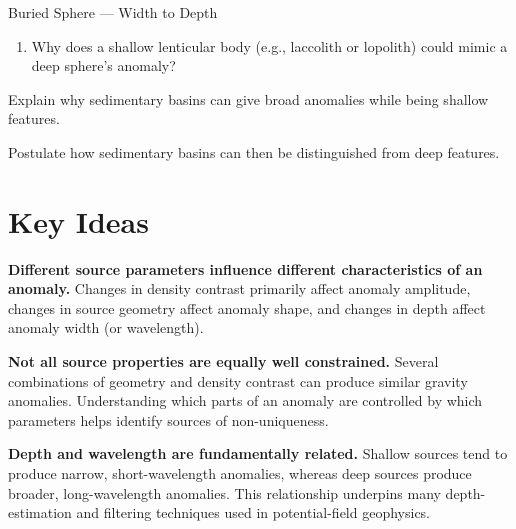 \begin{activity}{Buried Sphere --- Width to Depth}
\begin{questions}
\begin{enumerate}[label=\alph*]
      \item Why does a shallow lenticular body (e.g., laccolith or lopolith) could mimic a deep sphere's anomaly?
      \answerbox{36pt}
    \end{enumerate}

    Explain why sedimentary basins can give broad anomalies while being shallow features.
    \answerbox

    Postulate how sedimentary basins can then be distinguished from deep features.
    \answerbox

\end{questions}

\section*{Key Ideas}

\textbf{Different source parameters influence different characteristics of an anomaly.}
Changes in density contrast primarily affect anomaly amplitude, changes in source geometry affect anomaly shape, and changes in depth affect anomaly width (or wavelength).

\textbf{Not all source properties are equally well constrained.}
Several combinations of geometry and density contrast can produce similar gravity anomalies. Understanding which parts of an anomaly are controlled by which parameters helps identify sources of non-uniqueness.

\textbf{Depth and wavelength are fundamentally related.}
Shallow sources tend to produce narrow, short-wavelength anomalies, whereas deep sources produce broader, long-wavelength anomalies. This relationship underpins many depth-estimation and filtering techniques used in potential-field geophysics.

\end{activity}